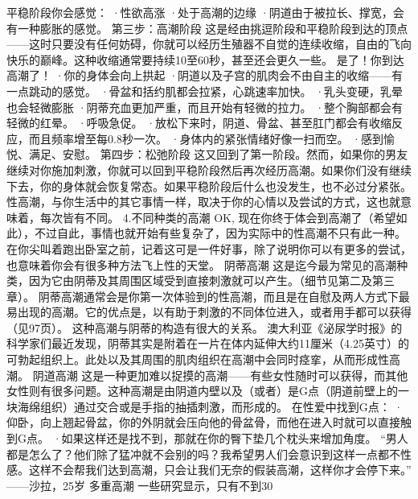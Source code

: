 \documentclass[12pt,UTF8,openany]{ctexbook}
\begin{document}
平稳阶段你会感觉：
·性欲高涨
·处于高潮的边缘
·阴道由于被拉长、撑宽，会有一种膨胀的感觉。
第三步：高潮阶段
这是经由挑逗阶段和平稳阶段到达的顶点——这时只要没有任何妨碍，你就可以经历生殖器不自觉的连续收缩，自由的飞向快乐的巅峰。这种收缩通常要持续10至60秒，甚至还会更久一些。
是了！你到达高潮了！
·你的身体会向上拱起
·阴道以及子宫的肌肉会不由自主的收缩——有一点跳动的感觉。
·骨盆和括约肌都会拉紧，心跳速率加快。
·乳头变硬，乳晕也会轻微膨胀
·阴蒂充血更加严重，而且开始有轻微的拉力。
·整个胸部都会有轻微的红晕。
·呼吸急促。
·放松下来时，阴道、骨盆、甚至肛门都会有收缩反应，而且频率增至每0.8秒一次。
·身体内的紧张情绪好像一扫而空。
·感到愉悦、满足、安慰。
第四步：松弛阶段
这又回到了第一阶段。然而，如果你的男友继续对你施加刺激，你就可以回到平稳阶段然后再次经历高潮。如果你们没有继续下去，你的身体就会恢复常态。如果平稳阶段后什么也没发生，也不必过分紧张。性高潮，与你生活中的其它事情一样，取决于你的心情以及尝试的方式，这也就意味着，每次皆有不同。
4.不同种类的高潮
OK, 现在你终于体会到高潮了（希望如此），不过自此，事情也就开始有些复杂了，因为实际中的性高潮不只有此一种。在你尖叫着跑出卧室之前，记着这可是一件好事，除了说明你可以有更多的尝试，也意味着你会有很多种方法飞上性的天堂。
阴蒂高潮
这是迄今最为常见的高潮种类，因为它由阴蒂及其周围区域受到直接刺激就可以产生。（细节见第二及第三章）。
阴蒂高潮通常会是你第一次体验到的性高潮，而且是在自慰及两人方式下最易出现的高潮。它的优点是，以有助于刺激的不同体位进入，或者用手都可以获得（见97页）。
这种高潮与阴蒂的构造有很大的关系。
澳大利亚《泌尿学时报》的科学家们最近发现，阴蒂其实是附着在一片在体内延伸大约11厘米（4.25英寸）的可勃起组织上。此处以及其周围的肌肉组织在高潮中会同时痉挛，从而形成性高潮。
阴道高潮
这是一种更加难以捉摸的高潮——有些女性随时可以获得，而其他女性则有很多问题。这种高潮是由阴道内壁以及（或者）是G点（阴道前壁上的一块海绵组织）通过交合或是手指的抽插刺激，而形成的。
在性爱中找到G点：
·仰卧，向上翘起骨盆，你的外阴就会压向他的骨盆骨，而他在进入时就可以直接触到G点。
·如果这样还是找不到，那就在你的臀下垫几个枕头来增加角度。
“男人都是怎么了？他们除了猛冲就不会别的吗？我希望男人们会意识到这样一点都不性感。这样不会帮我们达到高潮，只会让我们无奈的假装高潮，这样你才会停下来。”
——沙拉，25岁
多重高潮
一些研究显示，只有不到30%
\end{document}
